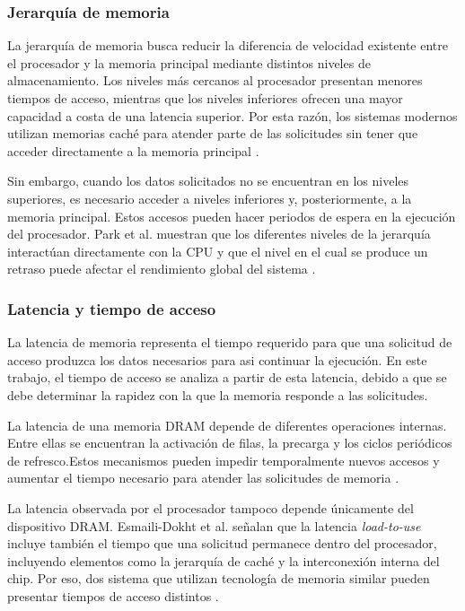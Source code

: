
\subsubsection{Jerarquía de memoria}

La jerarquía de memoria busca reducir la diferencia de velocidad existente
entre el procesador y la memoria principal mediante distintos niveles de
almacenamiento. Los niveles más cercanos al procesador presentan menores
tiempos de acceso, mientras que los niveles inferiores ofrecen una mayor
capacidad a costa de una latencia superior. Por esta razón, los sistemas
modernos utilizan memorias caché para atender parte de las solicitudes sin
tener que acceder directamente a la memoria principal
\cite{park2022dvfs}.

Sin embargo, cuando los datos solicitados no se encuentran en los niveles
superiores, es necesario acceder a niveles inferiores y, posteriormente, 
a la memoria principal. Estos accesos pueden hacer periodos de espera en 
la ejecución del procesador. Park et al. muestran que los diferentes niveles 
de la jerarquía interactúan directamente con la CPU y que el nivel en el 
cual se produce un retraso puede afectar el rendimiento global del sistema 
\cite{park2022dvfs}.

\subsubsection{Latencia y tiempo de acceso}

La latencia de memoria representa el tiempo requerido para que una solicitud 
de acceso produzca los datos necesarios para asi continuar la ejecución.
En este trabajo, el tiempo de acceso se analiza a partir de esta latencia,
debido a que se debe determinar la rapidez con la que la memoria responde
a las solicitudes.

La latencia de una memoria DRAM depende de diferentes operaciones internas.
Entre ellas se encuentran la activación de filas, la precarga y los ciclos
periódicos de refresco.Estos mecanismos pueden impedir temporalmente nuevos 
accesos y aumentar el tiempo necesario para atender las solicitudes de memoria 
\cite{shahbazi2026ddr4}.

La latencia observada por el procesador tampoco depende únicamente del dispositivo
DRAM. Esmaili-Dokht et al. señalan que la latencia \textit{load-to-use} incluye 
también el tiempo que una solicitud permanece dentro del procesador, incluyendo 
elementos como la jerarquía de caché y la interconexión interna del chip. Por eso,
dos sistema que utilizan tecnología de memoria similar pueden presentar tiempos de 
acceso distintos \cite{esmailidokht2024mess}.

